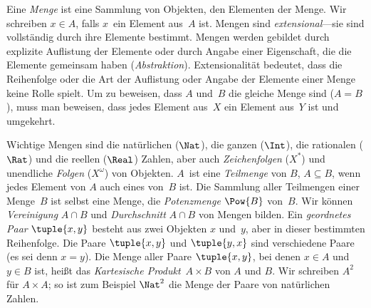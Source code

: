 Eine \emph{Menge} ist eine Sammlung von Objekten, den Elementen der Menge. Wir
schreiben $x \in A$, falls $x$~ein Element aus~$A$ ist. Mengen sind
\emph{extensional}---sie sind vollständig durch ihre Elemente bestimmt.
Mengen werden gebildet durch explizite Auflistung der Elemente oder durch
Angabe einer Eigenschaft, die die Elemente gemeinsam haben
(\emph{Abstraktion}). Extensionalität bedeutet, dass die Reihenfolge oder die Art der
Auflistung oder Angabe der Elemente einer Menge keine Rolle spielt. Um zu beweisen,
dass $A$ und~$B$ die gleiche Menge sind ($A = B$), muss man beweisen, dass
jedes Element aus~$X$ ein Element aus~$Y$ ist und umgekehrt.

Wichtige Mengen sind die natürlichen ($\Nat$), die ganzen ($\Int$),
die rationalen ($\Rat$) und die reellen ($\Real$) Zahlen, aber auch \emph{Zeichenfolgen}
($X^*$) und unendliche \emph{Folgen} ($X^\omega$) von Objekten. $A$~ist
eine \emph{Teilmenge} von $B$, $A \subseteq B$, wenn jedes Element von $A$
auch eines von~$B$ ist. Die Sammlung aller Teilmengen einer Menge~$B$ ist selbst
eine Menge, die \emph{Potenzmenge} $\Pow{B}$ von~$B$. Wir können
\emph{Vereinigung} $A \cap B$ und \emph{Durchschnitt} $A \cap B$ von Mengen bilden. Ein
\emph{geordnetes Paar} $\tuple{x, y}$ besteht aus zwei Objekten $x$
und~$y$, aber in dieser bestimmten Reihenfolge. Die Paare $\tuple{x, y}$ und
$\tuple{y, x}$ sind verschiedene Paare (es sei denn $x = y$). Die Menge aller
Paare $\tuple{x, y}$, bei denen $x \in A$ und $y \in B$ ist, heißt das
\emph{Kartesische Produkt}~$A \times B$ von $A$ und $B$. Wir schreiben $A^2$
für $A \times A$; so ist zum Beispiel $\Nat^2$ die Menge der Paare von
natürlichen Zahlen.

